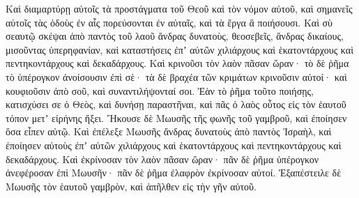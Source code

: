 {Καὶ διαμαρτύρῃ αὐτοῖς τὰ προστάγματα τοῦ Θεοῦ καὶ τὸν νόμον αὐτοῦ, καὶ σημανεῖς αὐτοῖς τὰς ὁδοὺς ἐν αἷς πορεύσονται ἐν αὐταῖς, καὶ τὰ ἔργα ἃ ποιήσουσι.
Καὶ σὺ σεαυτῷ σκέψαι ἀπὸ παντὸς τοῦ λαοῦ ἄνδρας δυνατοὺς, θεοσεβεῖς, ἄνδρας δικαίους, μισοῦντας ὑπερηφανίαν, καὶ καταστήσεις ἐπʼ αὐτῶν χιλιάρχους καὶ ἑκατοντάρχους καὶ πεντηκοντάρχους καὶ δεκαδάρχους.
Καὶ κρινοῦσι τὸν λαὸν πᾶσαν ὥραν· τὸ δὲ ῥῆμα τὸ ὑπέρογκον ἀνοίσουσιν ἐπὶ σὲ· τὰ δὲ βραχέα τῶν κριμάτων κρινοῦσιν αὐτοί· καὶ κουφιοῦσιν ἀπὸ σοῦ, καὶ συναντιλήψονταί σοι.
Ἐὰν τὸ ῥῆμα τοῦτο ποιήσῃς, κατισχύσει σε ὁ Θεὸς, καὶ δυνήσῃ παραστῆναι, καὶ πᾶς ὁ λαὸς οὗτος εἰς τὸν ἑαυτοῦ τόπον μετʼ εἰρήνης ἥξει.
Ἤκουσε δὲ Μωυσῆς τῆς φωνῆς τοῦ γαμβροῦ, καὶ ἐποίησεν ὅσα εἶπεν αὐτῷ.
Καὶ ἐπέλεξε Μωυσῆς ἄνδρας δυνατοὺς ἀπὸ παντὸς Ἰσραὴλ, καὶ ἐποίησεν αὐτοὺς ἐπʼ αὐτῶν χιλιάρχους καὶ ἑκατοντάρχους καὶ πεντηκοντάρχους καὶ δεκαδάρχους.
Καὶ ἐκρίνοσαν τὸν λαὸν πᾶσαν ὥραν· πᾶν δὲ ῥῆμα ὑπέρογκον ἀνεφέροσαν ἐπὶ Μωυσῆν· πᾶν δὲ ῥῆμα ἐλαφρὸν ἐκρίνοσαν αὐτοί.
Ἐξαπέστειλε δὲ Μωυσῆς τὸν ἑαυτοῦ γαμβρὸν, καὶ ἀπῆλθεν εἰς τὴν γῆν αὐτοῦ.

}

